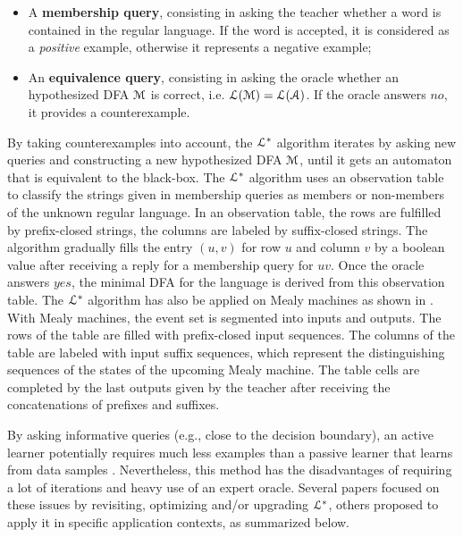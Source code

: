 \begin{itemize}
    \item A \textbf{membership query}, consisting in asking the
        teacher whether a word is contained in the regular
        language.  If the word is accepted, it is considered as a
        \textit{positive} example, otherwise it represents a
        negative example;

    \item An \textbf{equivalence query}, consisting in asking the
        oracle whether an hypothesized DFA $\EuScript{M}$ is
        correct, i.e. $\EuScript{L}(\EuScript{M}) =
        \EuScript{L}(\EuScript{A})$. If the oracle answers $no$,
        it provides a counterexample.
\end{itemize}

By taking counterexamples into account, the $\EuScript{L}^*$
algorithm iterates by asking new queries and constructing a new
hypothesized DFA $\EuScript{M}$, until it gets an automaton that
is equivalent to the black-box. The $\EuScript{L}^*$ algorithm
uses an observation table to classify the strings given in
membership queries as members or non-members of the unknown
regular language. In an observation table, the rows are fulfilled
by prefix-closed strings, the columns are labeled by
suffix-closed strings. The algorithm gradually fills the entry
$(u,v)$ for row $u$ and column $v$ by a boolean value after
receiving a reply for a membership query for $uv$. Once the
oracle answers $yes$, the minimal DFA for the language is derived
from this observation table. The $\EuScript{L}^*$
algorithm has also be applied on Mealy machines as shown in
\cite{DBLP:phd/de/Niese2003,steffen11}. With Mealy machines, the
event set is segmented into inputs and outputs. The rows of the
table are filled with prefix-closed input sequences. The columns
of the table are labeled with input suffix sequences, which
represent the distinguishing sequences of the states of the
upcoming Mealy machine. The table cells are completed by the last
outputs given by the teacher after receiving the concatenations
of prefixes and suffixes.

By asking informative queries (e.g., close to the decision
boundary), an active learner potentially requires much less
examples than a passive learner that learns from data samples
\cite{settles.tr09}. Nevertheless, this method has the
disadvantages of requiring a lot of iterations and heavy use of
an expert oracle. Several papers focused on these issues by
revisiting, optimizing and/or upgrading $\EuScript{L}^*$, others
proposed to apply it in specific application contexts, as
summarized below.

